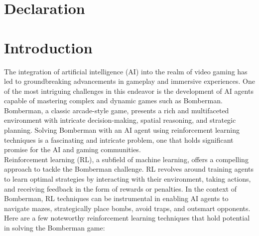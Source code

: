 \documentclass[a4paper,12pt,headsepline, fleqn, english]{scrartcl}%
\begin{document}
	
	
	
	\newpage
	
	\section{Declaration}
	
	\newpage
	
	\setcounter{page}{1}
	
	\thispagestyle{empty}
	\tableofcontents
	
	\newpage
	
	
	\section{Introduction}

	The integration of artificial intelligence (AI) into the realm of video gaming has led to groundbreaking advancements 
	in gameplay and immersive experiences. One of the most intriguing challenges in this endeavor is the development of AI 
	agents capable of mastering complex and dynamic games such as Bomberman. Bomberman, a classic arcade-style game, 
	presents a rich and multifaceted environment with intricate decision-making, spatial reasoning, and strategic planning. 
	Solving Bomberman with an AI agent using reinforcement learning techniques is a fascinating and intricate problem, one 
	that holds significant promise for the AI and gaming communities.\\

	\noindent Reinforcement learning (RL), a subfield of machine learning, offers a compelling approach to tackle 
	the Bomberman challenge. RL revolves around training agents to learn optimal strategies by interacting with their 
	environment, taking actions, and receiving feedback in the form of rewards or penalties. In the context of Bomberman, 
	RL techniques can be instrumental in enabling AI agents to navigate mazes, strategically place bombs, avoid traps, and 
	outsmart opponents. Here are a few noteworthy reinforcement learning techniques that hold potential in solving the Bomberman game:
\end{document}
